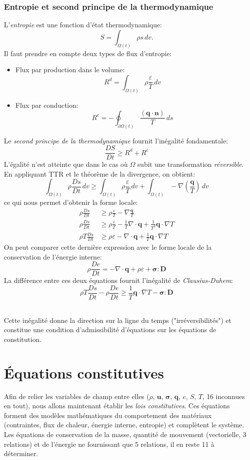 \section{Entropie et second principe de la thermodynamique}
L'\emph{entropie} est une fonction d'état thermodynamique: $$S=\int_{\Omega (t)}\rho s\,dv.$$ Il faut prendre en compte deux types de flux d'entropie:
\begin{itemize}
\item Flux par production dans le volume: $$R^d=\int_{\Omega (t)}\rho \frac{\varepsilon}{T}\,dv$$
\item Flux par conduction: $$R^c=-\oint_{\partial \Omega (t)}\frac{(\textbf{q}\cdot\textbf{\^n})}{T}\,ds$$
\end{itemize}
Le \emph{second principe de la thermodynamique} fournit l'inégalité fondamentale:
$$\boxed{\frac{DS}{Dt}\geq R^d+R^c}$$ L'égalité n'est atteinte que dans le cas où $\Omega$ subit une transformation \emph{réversible}. En appliquant TTR et le théorème de la divergence, on obtient:
$$\int_{\Omega (t)}\rho\frac{Ds}{Dt}\,dv\geq \int_{\Omega (t)}\rho \frac{\varepsilon}{T}\,dv+\int_{\Omega (t)}-\nabla\left(\frac{\textbf{q}}{T}\right)\,dv$$
ce qui nous permet d'obtenir la forme locale:
\begin{align*}
\rho\frac{Ds}{Dt}&\geq \rho \frac{\varepsilon}{T}-\nabla\frac{\textbf{q}}{T}\\
\rho\frac{Ds}{Dt}&\geq \rho \frac{\varepsilon}{T}-\frac{1}{T}\nabla\cdot\textbf{q}+\frac{1}{T^2}\textbf{q}\cdot\nabla T\\
\rho T\frac{Ds}{Dt}&\geq \rho \varepsilon-\nabla\cdot\textbf{q}+\frac{1}{T}\textbf{q}\cdot\nabla T
\end{align*}
On peut comparer cette dernière expression avec le forme locale de la conservation de l'énergie interne:
$$\rho\frac{De}{Dt}=-\nabla\cdot\textbf{q}+\rho\varepsilon+\boldsymbol{\sigma}:\textbf{D}$$
La différence entre ces deux équations fournit l'inégalité de \emph{Clausius-Duhem}:
$$\boxed{\rho T\frac{Ds}{Dt}-\rho\frac{De}{Dt}\geq\frac{1}{T}\textbf{q}\cdot\nabla T-\boldsymbol{\sigma}:\textbf{D}}$$
\paragraph{}
Cette inégalité donne la direction sur la ligne du temps ("irréversibilités") et constitue une condition d'admissibilité d'équations sur les équations de constitution.

\part{\'Equations constitutives}
Afin de relier les variables de champ entre elles ($\rho$, $\textbf{u}$, $\boldsymbol{\sigma}$, $\textbf{q}$, $e$, $S$, $T$, 16 inconnues en tout), nous allons maintenant établir les \emph{lois constitutives}. Ces équations forment des modèles mathématiques du comportement des matériaux (contraintes, flux de chaleur, énergie interne, entropie) et complètent le système. Les équations de conservation de la masse, quantité de mouvement (vectorielle, 3 relations) et de l'énergie ne fournissant que 5 relations, il en reste 11 à déterminer.

